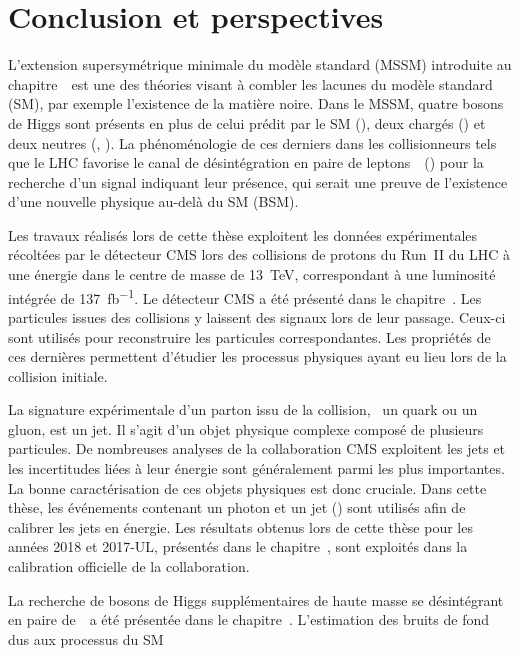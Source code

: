 \chapter*{Conclusion et perspectives}\label{chapter-conclusion}

L'extension supersymétrique minimale du modèle standard (MSSM)
introduite au chapitre~\
est une des théories visant à combler les lacunes du modèle standard (SM),
par exemple l'existence de la matière noire.
Dans le MSSM,
quatre bosons de Higgs sont présents en plus de celui prédit par le SM (\higgs),
deux chargés (\Higgspm)
et
deux neutres (\Higgs, \HiggsA).
La phénoménologie de ces derniers dans les collisionneurs tels que le LHC
favorise le canal de désintégration en paire de leptons~\tau\
(\HAtoTauTau)
pour la recherche d'un signal indiquant leur présence,
qui serait une preuve de l'existence d'une nouvelle physique
au-delà du SM (BSM).
\par
Les travaux réalisés lors de cette thèse
exploitent les données expérimentales
récoltées par le détecteur CMS
lors des collisions de protons du Run~II du LHC
à une énergie dans le centre de masse de \SI{13}{\TeV},
correspondant à une luminosité intégrée de \SI{137}{\femto\barn^{-1}}.
Le détecteur CMS a été présenté dans le chapitre~.
Les particules issues des collisions y laissent des signaux lors de leur passage.
Ceux-ci sont utilisés pour reconstruire les particules correspondantes.
Les propriétés de ces dernières permettent d'étudier les processus physiques
ayant eu lieu lors de la collision initiale.
\par
La signature expérimentale
d'un parton issu de la collision, \ie\ un quark ou un gluon,
est un jet.
Il s'agit d'un objet physique complexe
composé de plusieurs particules.
De nombreuses analyses de la collaboration CMS exploitent les jets
et
les incertitudes liées à leur énergie sont généralement parmi les plus importantes.
La bonne caractérisation de ces objets physiques est donc cruciale.
Dans cette thèse,
les événements contenant un photon et un jet (\Gjet)
sont utilisés afin de calibrer les jets en énergie.
Les résultats obtenus lors de cette thèse pour les années 2018 et 2017-UL,
présentés dans le chapitre~\refChJERC,
sont exploités dans la calibration officielle de la collaboration.
\par
La recherche de bosons de Higgs supplémentaires de haute masse se désintégrant en paire de~\tau\
a été présentée dans le chapitre~.
L'estimation des bruits de fond dus aux processus du SM
